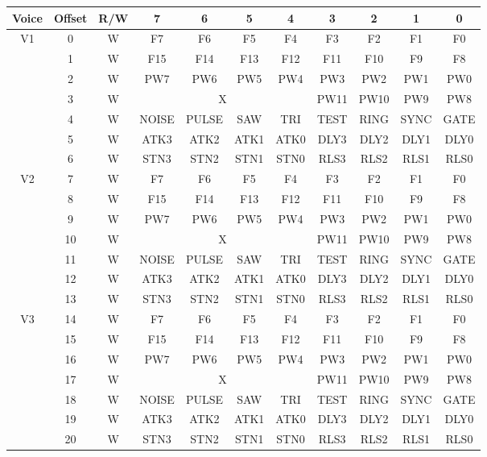 \begin{table}[ht]
	\begin{center}
		\begin{tabular}{|c|c|c|c|c|c|c|c|c|c|c|} \hline
			Voice & Offset & R/W & 7 & 6 & 5 & 4 & 3 & 2 & 1 & 0 \\ \hline\hline
            \multirow{7}{*}{V1} & 0 & W & F7 & F6 & F5 & F4 & F3 & F2 & F1 & F0 \\ \cline{2-11}
            & 1 & W & F15 & F14 & F13 & F12 & F11 & F10 & F9 & F8 \\ \cline{2-11}
            & 2 & W & PW7 & PW6 & PW5 & PW4 & PW3 & PW2 & PW1 & PW0 \\ \cline{2-11}
            & 3 & W & \multicolumn{4}{|c|}{X} & PW11 & PW10 & PW9 & PW8 \\ \cline{2-11}
            & 4 & W & NOISE & PULSE & SAW & TRI & TEST & RING & SYNC & GATE \\ \cline{2-11}
            & 5 & W & ATK3 & ATK2 & ATK1 & ATK0 & DLY3 & DLY2 & DLY1 & DLY0 \\ \cline{2-11}
            & 6 & W & STN3 & STN2 & STN1 & STN0 & RLS3 & RLS2 & RLS1 & RLS0 \\ \hline\hline

            \multirow{7}{*}{V2} & 7 & W & F7 & F6 & F5 & F4 & F3 & F2 & F1 & F0\\ \cline{2-11}
            & 8 & W & F15 & F14 & F13 & F12 & F11 & F10 & F9 & F8 \\ \cline{2-11}
            & 9 & W & PW7 & PW6 & PW5 & PW4 & PW3 & PW2 & PW1 & PW0 \\ \cline{2-11}
            & 10 & W & \multicolumn{4}{|c|}{X} & PW11 & PW10 & PW9 & PW8 \\ \cline{2-11}
            & 11 & W & NOISE & PULSE & SAW & TRI & TEST & RING & SYNC & GATE \\ \cline{2-11}
            & 12 & W & ATK3 & ATK2 & ATK1 & ATK0 & DLY3 & DLY2 & DLY1 & DLY0 \\ \cline{2-11}
            & 13 & W & STN3 & STN2 & STN1 & STN0 & RLS3 & RLS2 & RLS1 & RLS0 \\ \hline\hline

            \multirow{7}{*}{V3} & 14 & W & F7 & F6 & F5 & F4 & F3 & F2 & F1 & F0 \\ \cline{2-11}
            & 15 & W & F15 & F14 & F13 & F12 & F11 & F10 & F9 & F8 \\ \cline{2-11}
            & 16 & W & PW7 & PW6 & PW5 & PW4 & PW3 & PW2 & PW1 & PW0 \\ \cline{2-11}
            & 17 & W & \multicolumn{4}{|c|}{X} & PW11 & PW10 & PW9 & PW8 \\ \cline{2-11}
            & 18 & W & NOISE & PULSE & SAW & TRI & TEST & RING & SYNC & GATE \\ \cline{2-11}
            & 19 & W & ATK3 & ATK2 & ATK1 & ATK0 & DLY3 & DLY2 & DLY1 & DLY0 \\ \cline{2-11}
            & 20 & W & STN3 & STN2 & STN1 & STN0 & RLS3 & RLS2 & RLS1 & RLS0 \\ \hline\hline


\end{tabular}
\end{center}
\end{table}
